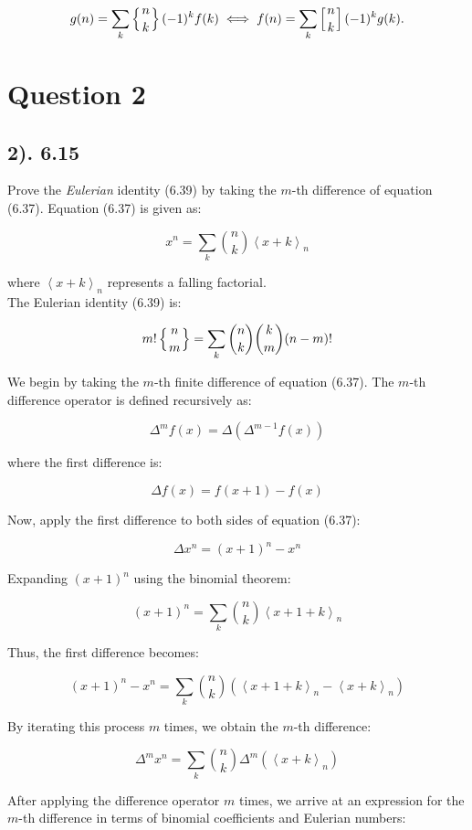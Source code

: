 \documentclass[12pt]{article}
\begin{document}
\[
g(n) = \sum_k \left\{ {n \atop k} \right\} (-1)^k f(k) 
\iff 
f(n) = \sum_k  \left[ {n  \atop k }  \right] (-1)^k g(k).
\]

\section*{Question 2}
\subsection*{2). 6.15}

Prove the \textit{Eulerian} identity (6.39) by taking the \(m\)-th difference of equation (6.37). Equation (6.37) is given as:

\[
x^n = \sum_k \binom{n}{k} \left\langle x + k \right\rangle_n
\]

where \( \left\langle x + k \right\rangle_n \) represents a falling factorial.\\

The Eulerian identity (6.39) is:

\[
m! \left\{ n \atop m \right\} = \sum_k \binom{n}{k} \binom{k}{m} (n - m)!
\]

We begin by taking the \(m\)-th finite difference of equation (6.37). The \(m\)-th difference operator is defined recursively as:

\[
\Delta^m f(x) = \Delta (\Delta^{m-1} f(x))
\]

where the first difference is:

\[
\Delta f(x) = f(x+1) - f(x)
\]

Now, apply the first difference to both sides of equation (6.37):

\[
\Delta x^n = (x+1)^n - x^n
\]

Expanding \( (x+1)^n \) using the binomial theorem:

\[
(x+1)^n = \sum_k \binom{n}{k} \left\langle x + 1 + k \right\rangle_n
\]

Thus, the first difference becomes:

\[
(x+1)^n - x^n = \sum_k \binom{n}{k} \left( \left\langle x + 1 + k \right\rangle_n - \left\langle x + k \right\rangle_n \right)
\]

By iterating this process \(m\) times, we obtain the \(m\)-th difference:

\[
\Delta^m x^n = \sum_k \binom{n}{k} \Delta^m \left( \left\langle x + k \right\rangle_n \right)
\]

After applying the difference operator \(m\) times, we arrive at an expression for the \(m\)-th difference in terms of binomial coefficients and Eulerian numbers:
\end{document}
